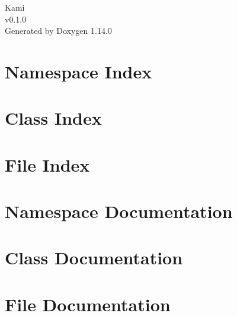 \documentclass[twoside]{book}
\newcommand{\+}{\discretionary{\mbox{\scriptsize$\hookleftarrow$}}{}{}}
\newcommand{\clearemptydoublepage}{%
    \newpage{\pagestyle{empty}\cleardoublepage}%
  }
\begin{document}
  \raggedbottom
    \hypersetup{pageanchor=false,
                bookmarksnumbered=true,
                pdfencoding=unicode
               }
  \begin{titlepage}
  \vspace*{7cm}
  \begin{center}%
  {\Large Kami}\\
  [1ex]\large v0.\+1.\+0 \\
  \vspace*{1cm}
  {\large Generated by Doxygen 1.14.0}\\
  \end{center}
  \end{titlepage}
  \clearemptydoublepage
  \tableofcontents
  \clearemptydoublepage
  \hypersetup{pageanchor=true}
\chapter{Namespace Index}

\chapter{Class Index}

\chapter{File Index}

\chapter{Namespace Documentation}

\chapter{Class Documentation}



\chapter{File Documentation}





  \backmatter
  \newpage
  \clearemptydoublepage
  \printindex
\end{document}
